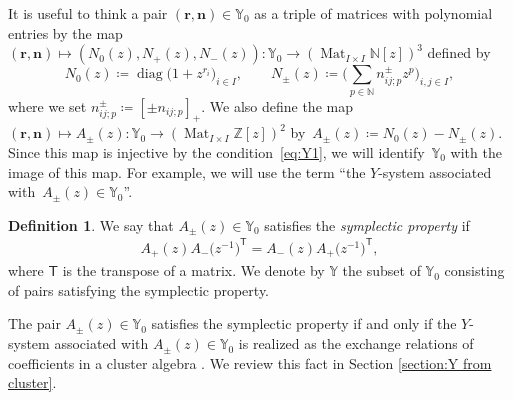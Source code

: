 \documentclass[10pt,a4paper]{amsart}
\numberwithin{equation}{section}
\theoremstyle{definition}
\newtheorem{Definition}[Theorem]{Definition}
\DeclareMathOperator{\diag}{diag}
\DeclareMathOperator{\mat}{Mat}
\newcommand*{\maxzero}[1]{[#1]_{+}}
\begin{document}
It is useful to think a pair $(\bm{r}, \bm{n}) \in \mathbb{Y}_0$ as a triple of matrices with polynomial entries
by the map
$(\bm{r}, \bm{n}) \mapsto (N_0(z), N_+(z), N_-(z)) \colon \mathbb{Y}_0 \to (\mat_{I \times I} \mathbb{N} [z])^3$ defined by
\[
 N_0(z) \coloneqq \diag\bigl(1 + z^{r_i}\bigr)_{i \in I}, \qquad
 N_{\pm} (z) \coloneqq \biggr(\sum_{p \in \mathbb{N}} n_{ij;p}^\pm z^p \biggl)_{i, j \in I},
\]
where we set $n_{ij;p}^\pm \coloneqq \maxzero{\pm n_{ij;p}}$.
We also define the map $(\bm{r}, \bm{n}) \mapsto A_\pm (z)\colon \mathbb{Y}_0 \to (\mat_{I \times I} \mathbb{Z} [z])^2$
by~${A_{\pm}(z) \coloneqq N_0(z) - N_{\pm}(z)}$.
Since this map is injective by the condition~\eqref{eq:Y1},
we will identify~$\mathbb{Y}_0$ with the image of this map.
For example, we will use the term ``the $Y$-system associated with~${A_\pm (z) \in \mathbb{Y}_0}$''.

\begin{Definition}
 We say that $A_\pm (z) \in \mathbb{Y}_0$ satisfies the \emph{symplectic property} if
 \begin{align}\label{eq:symplectic property}
 A_+ (z) A_-\bigl(z^{-1}\bigr)^{\mathsf{T}} = A_- (z) A_+ \bigl(z^{-1}\bigr)^{\mathsf{T}},
 \end{align}
 where $\mathsf{T}$ is the transpose of a matrix.
 We denote by $\mathbb{Y}$ the subset of $\mathbb{Y}_0$ consisting of pairs satisfying the symplectic property.
\end{Definition}

The pair $A_\pm(z) \in \mathbb{Y}_0$ satisfies the symplectic property if and only if
the $Y$-system associated with $A_\pm (z) \in \mathbb{Y}_0$ is realized as the exchange relations of coefficients
in a cluster algebra \cite{mizuno2020difference}.
We review this fact in Section \ref{section:Y from cluster}.
\end{document}
